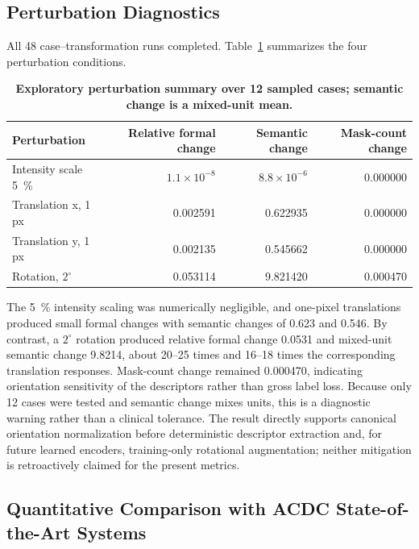 \documentclass{ceurart}
\begin{document}
\subsection{Perturbation Diagnostics}\label{subsec:perturbation_diagnostics}

All 48 case--transformation runs completed. Table~\ref{tab:perturbation_summary} summarizes the four perturbation conditions.

\begin{table}[!htbp]
\caption{\textbf{Exploratory perturbation summary over 12 sampled cases; semantic change is a mixed-unit mean.}}
\label{tab:perturbation_summary}
\centering
\small
\begin{tabular}{lrrr}
\toprule
Perturbation & Relative formal change & Semantic change & Mask-count change \\
\midrule
Intensity scale 5~\% & \(1.1\times10^{-8}\) & \(8.8\times10^{-6}\) & 0.000000 \\
Translation x, 1 px & 0.002591 & 0.622935 & 0.000000 \\
Translation y, 1 px & 0.002135 & 0.545662 & 0.000000 \\
Rotation, \(2^\circ\) & 0.053114 & 9.821420 & 0.000470 \\
\bottomrule
\end{tabular}
\end{table}

The 5~\% intensity scaling was numerically negligible, and one-pixel translations produced small formal changes with semantic changes of 0.623 and 0.546. By contrast, a \(2^\circ\) rotation produced relative formal change 0.0531 and mixed-unit semantic change 9.8214, about 20--25 times and 16--18 times the corresponding translation responses. Mask-count change remained 0.000470, indicating orientation sensitivity of the descriptors rather than gross label loss. Because only 12 cases were tested and semantic change mixes units, this is a diagnostic warning rather than a clinical tolerance. The result directly supports canonical orientation normalization before deterministic descriptor extraction and, for future learned encoders, training-only rotational augmentation; neither mitigation is retroactively claimed for the present metrics.

\subsection{Quantitative Comparison with ACDC State-of-the-Art Systems}\label{subsec:acdc_sota_comparison}
\end{document}
